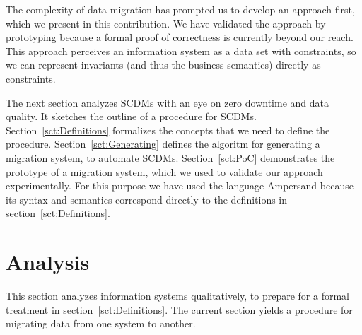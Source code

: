 \documentclass[runningheads]{llncs}
\newcommand{\ourtheory}{approach}
\begin{document}
   The complexity of data migration has prompted us to develop an \ourtheory{} first,
   which we present in this contribution.
   We have validated the \ourtheory{} by prototyping because a formal proof of correctness is currently beyond our reach.
   This \ourtheory{} perceives an information system as a data set with constraints,
   so we can represent invariants (and thus the business semantics) directly as constraints.

   The next section analyzes SCDMs with an eye on zero downtime and data quality.
   It sketches the outline of a procedure for SCDMs.
   Section~\ref{sct:Definitions} formalizes the concepts that we need to define the procedure.
   Section~\ref{sct:Generating} defines the algoritm for generating a migration system, to automate SCDMs.
   Section~\ref{sct:PoC} demonstrates the prototype of a migration system, which we used to validate our \ourtheory{} experimentally.
   For this purpose we have used the language Ampersand
   because its syntax and semantics correspond directly to the definitions in section~\ref{sct:Definitions}.

\section{Analysis}
\label{sct:Analysis}
   This section analyzes information systems qualitatively, to prepare for a formal treatment in section~\ref{sct:Definitions}.
   The current section yields a procedure for migrating data from one system to another.
\end{document}
